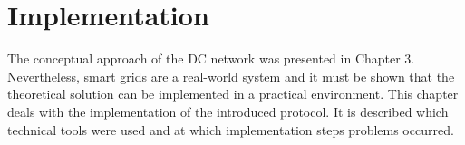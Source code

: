 \chapter{Implementation}
\label{sec:implementation}




The conceptual approach of the DC network was presented in Chapter 3. Nevertheless, smart grids are a real-world system and it must be shown that the theoretical solution can be implemented in a practical environment. This chapter deals with the implementation of the introduced protocol. It is described which technical tools were used and at which implementation steps problems occurred.

